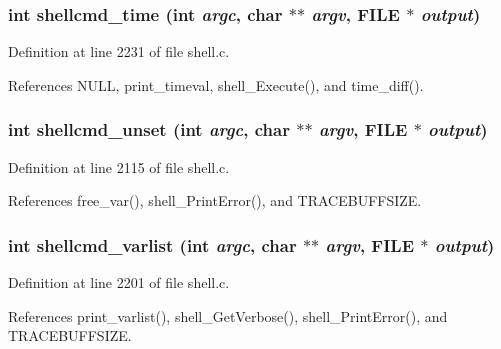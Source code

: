 \subsubsection{\setlength{\rightskip}{0pt plus 5cm}int shellcmd\_\-time (int {\em argc}, char $\ast$$\ast$ {\em argv}, FILE $\ast$ {\em output})}\label{shell_8c_a51}




Definition at line 2231 of file shell.c.

References NULL, print\_\-timeval, shell\_\-Execute(), and time\_\-diff().
\subsubsection{\setlength{\rightskip}{0pt plus 5cm}int shellcmd\_\-unset (int {\em argc}, char $\ast$$\ast$ {\em argv}, FILE $\ast$ {\em output})}\label{shell_8c_a48}




Definition at line 2115 of file shell.c.

References free\_\-var(), shell\_\-Print\-Error(), and TRACEBUFFSIZE.
\subsubsection{\setlength{\rightskip}{0pt plus 5cm}int shellcmd\_\-varlist (int {\em argc}, char $\ast$$\ast$ {\em argv}, FILE $\ast$ {\em output})}\label{shell_8c_a50}




Definition at line 2201 of file shell.c.

References print\_\-varlist(), shell\_\-Get\-Verbose(), shell\_\-Print\-Error(), and TRACEBUFFSIZE.